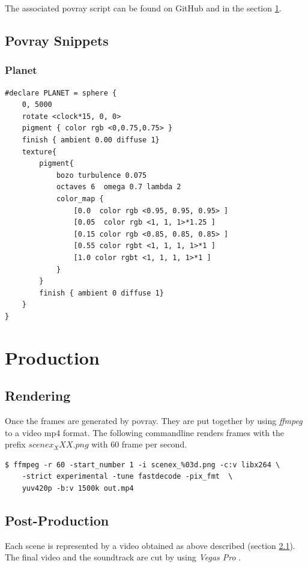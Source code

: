 The associated povray script can be found on GitHub \cite{Quving} and in the section \ref{povray_snippets}.

\newpage
\section{Povray Snippets} \label{povray_snippets}

\subsection{Planet}

\begin{lstlisting}
#declare PLANET = sphere {
	0, 5000
	rotate <clock*15, 0, 0>
	pigment { color rgb <0,0.75,0.75> }
	finish { ambient 0.00 diffuse 1}
	texture{
		pigment{
			bozo turbulence 0.075
			octaves 6  omega 0.7 lambda 2
			color_map {
				[0.0  color rgb <0.95, 0.95, 0.95> ]
				[0.05  color rgb <1, 1, 1>*1.25 ]
				[0.15 color rgb <0.85, 0.85, 0.85> ]
				[0.55 color rgbt <1, 1, 1, 1>*1 ]
				[1.0 color rgbt <1, 1, 1, 1>*1 ]
			}
		}
		finish { ambient 0 diffuse 1}
	}
}
\end{lstlisting}

\chapter{Production}

\section{Rendering} \label{rendering}
Once the frames are generated by povray. They are put together by using \textit{ffmpeg} to a video mp4 format. The following commandline renders frames with the prefix $scenex_XXX.png$ with 60 frame per second.

\begin{lstlisting}
$ ffmpeg -r 60 -start_number 1 -i scenex_%03d.png -c:v libx264 \
	-strict experimental -tune fastdecode -pix_fmt  \
	yuv420p -b:v 1500k out.mp4

\end{lstlisting}

\section{Post-Production}
Each scene is represented by a video obtained as above described (section \ref{rendering}). The final video and the soundtrack are cut by using \textit{Vegas Pro} \cite{VegasPro}.
